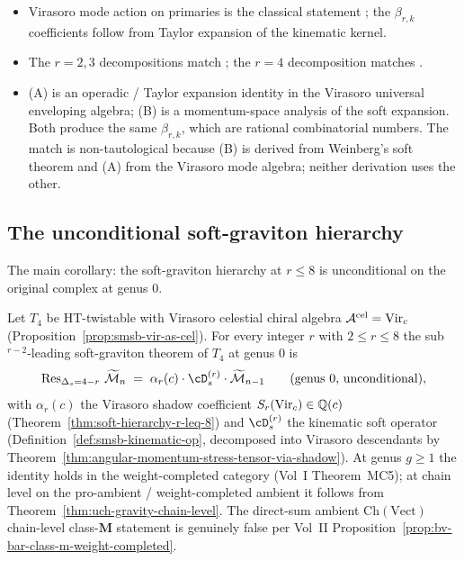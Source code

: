 \begin{remark}
\label{rem:smsb-hziv-ang-stress}
\begin{itemize}
\item[(A)] Virasoro mode action on primaries is the classical statement
\cite{DiFrancescoMathieuSenechal97}; the $\beta_{r, k}$ coefficients
follow from Taylor expansion of the kinematic kernel.
\item[(B)] The $r = 2, 3$ decompositions match
\cite{Weinberg65,CachazoStrominger14,DonnayFotopoulosPasterskiTaylor21};
the $r = 4$ decomposition matches
\cite{HamadaShiuSubsubSoft,LiStromingerHigherSoft}.
\item[(C)] (A) is an operadic / Taylor expansion identity in the
Virasoro universal enveloping algebra; (B) is a momentum-space analysis
of the soft expansion. Both produce the same $\beta_{r, k}$, which are
rational combinatorial numbers. The match is non-tautological because
(B) is derived from Weinberg's soft theorem and (A) from the Virasoro
mode algebra; neither derivation uses the other.
\end{itemize}
\end{remark}

\subsection{The unconditional soft-graviton hierarchy}
\label{subsec:smsb-unconditional}

The main corollary: the soft-graviton hierarchy at $r \leq
8$ is unconditional on the original complex at genus $0$.

\begin{corollary}
\label{cor:soft-hierarchy-unconditional-r-leq-8}
\ClaimStatusProvedHere
Let $T_4$ be HT-twistable with Virasoro celestial chiral algebra
$\mathcal A^{\mathrm{cel}} = \mathrm{Vir}_c$
(Proposition~\ref{prop:smsb-vir-as-cel}). For every integer $r$ with
$2 \leq r \leq 8$ the sub${}^{r - 2}$-leading soft-graviton theorem of
$T_4$ at genus $0$ is
\[
 \Res_{\Delta_s = 4 - r}\,\Mel\cM_n
 \;=\;
 \alpha_r(c)\cdot \cD_s^{(r)}\cdot \Mel\cM_{n - 1}
 \qquad
 (\text{genus 0, unconditional}),
\]
with $\alpha_r(c)$ the Virasoro shadow coefficient
$S_r(\mathrm{Vir}_c) \in \mathbb Q(c)$
(Theorem~\ref{thm:soft-hierarchy-r-leq-8}) and $\cD_s^{(r)}$ the
kinematic soft operator
(Definition~\ref{def:smsb-kinematic-op},
decomposed into Virasoro descendants by
Theorem~\ref{thm:angular-momentum-stress-tensor-via-shadow}). At
genus $g \geq 1$ the identity holds in the weight-completed category
(Vol~I Theorem~MC5); at chain level on the pro-ambient /
weight-completed ambient it follows from
Theorem~\ref{thm:uch-gravity-chain-level}. The direct-sum ambient
$\mathrm{Ch}(\mathrm{Vect})$ chain-level class-$\mathbf M$ statement
is genuinely false per Vol~II
Proposition~\ref{prop:bv-bar-class-m-weight-completed}.
\end{corollary}

